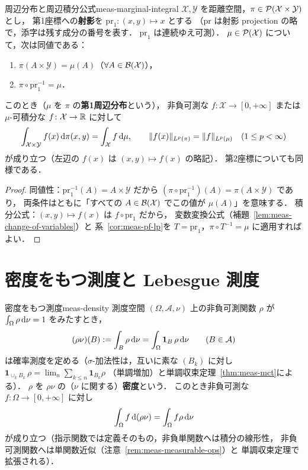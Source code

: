 \begin{lemma}{周辺分布と周辺積分公式}{meas-marginal-integral}
  $\mathcal{X},\mathcal{Y}$ を距離空間，$\pi\in\mathcal{P}(\mathcal{X}\times \mathcal{Y})$ とし，
  第1座標への\textbf{射影}を $\mathrm{pr}_1\colon(x,y)\mapsto x$ とする
  （$\mathrm{pr}$ は射影 projection の略で，添字は残す成分の番号を表す．
  $\mathrm{pr}_1$ は連続ゆえ可測）．
  $\mu\in\mathcal{P}(\mathcal{X})$ について，次は同値である：
  \begin{enumerate}
    \item $\pi(A\times \mathcal{Y})=\mu(A)$（$\forall A\in\mathcal{B}(\mathcal{X})$），
    \item $\pi\circ\mathrm{pr}_1^{-1}=\mu$．
  \end{enumerate}
  このとき（$\mu$ を $\pi$ の\textbf{第1周辺分布}という），
  非負可測な $f\colon \mathcal{X}\to[0,+\infty]$ または
  $\mu$-可積分な $f\colon \mathcal{X}\to\mathbb{R}$ に対して
  \[
    \int_{\mathcal{X}\times \mathcal{Y}}f(x)\,\mathrm{d}\pi(x,y)=\int_{\mathcal{X}} f\,\mathrm{d}\mu,
    \qquad
    \lVert f(x) \rVert_{L^p(\pi)}=\lVert f \rVert_{L^p(\mu)}
    \quad(1\leq p<\infty)
  \]
  が成り立つ（左辺の $f(x)$ は $(x,y)\mapsto f(x)$ の略記）．
  第2座標についても同様である．
\end{lemma}

\begin{proof}
  同値性：$\mathrm{pr}_1^{-1}(A)=A\times \mathcal{Y}$ だから
  $(\pi\circ\mathrm{pr}_1^{-1})(A)=\pi(A\times \mathcal{Y})$ であり，
  両条件はともに「すべての $A\in\mathcal{B}(\mathcal{X})$ でこの値が $\mu(A)$」を意味する．
  積分公式：$(x,y)\mapsto f(x)$ は $f\circ\mathrm{pr}_1$ だから，
  変数変換公式（補題~\ref{lem:meas-change-of-variables}）と
  系~\ref{cor:meas-pf-lp}を
  $T=\mathrm{pr}_1$，$\pi\circ T^{-1}=\mu$ に適用すればよい．
\end{proof}

\section{密度をもつ測度と Lebesgue 測度}

\begin{definition}{密度をもつ測度}{meas-density}
  測度空間 $(\Omega,\mathcal{A},\nu)$ 上の非負可測関数 $\rho$ が
  $\int_\Omega\rho\,\mathrm{d}\nu=1$ をみたすとき，
  \[
    (\rho\nu)(B):=\int_B\rho\,\mathrm{d}\nu
    =\int_\Omega\mathbf{1}_B\,\rho\,\mathrm{d}\nu
    \qquad(B\in\mathcal{A})
  \]
  は確率測度を定める（$\sigma$-加法性は，互いに素な $(B_k)$ に対し
  $\mathbf{1}_{\cup_kB_k}\,\rho=\lim_n\sum_{k\leq n}\mathbf{1}_{B_k}\rho$
  （単調増加）と単調収束定理~\ref{thm:meas-mct}による）．
  $\rho$ を $\rho\nu$ の（$\nu$ に関する）\textbf{密度}という．
  このとき非負可測な $f\colon\Omega\to[0,+\infty]$ に対し
  \[
    \int_\Omega f\,\mathrm{d}(\rho\nu)=\int_\Omega f\rho\,\mathrm{d}\nu
  \]
  が成り立つ（指示関数では定義そのもの，非負単関数へは積分の線形性，
  非負可測関数へは単関数近似（注意~\ref{rem:meas-measurable-ops}）と
  単調収束定理で拡張される）．
\end{definition}

